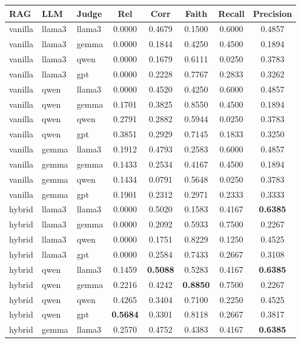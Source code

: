 
\begin{table}[ht]
\centering
\scriptsize
\begin{tabular}{lllccccc}
\toprule
RAG & LLM & Judge & Rel & Corr & Faith & Recall & Precision \\
\midrule

vanilla & llama3 & llama3 & 0.0000 & 0.4679 & 0.1500 & 0.6000 & 0.4857 \\
vanilla & llama3 & gemma & 0.0000 & 0.1844 & 0.4250 & 0.4500 & 0.1894 \\
vanilla & llama3 & qwen & 0.0000 & 0.1679 & 0.6111 & 0.0250 & 0.3783 \\
vanilla & llama3 & gpt & 0.0000 & 0.2228 & 0.7767 & 0.2833 & 0.3262 \\
vanilla & qwen & llama3 & 0.0000 & 0.4520 & 0.4250 & 0.6000 & 0.4857 \\
vanilla & qwen & gemma & 0.1701 & 0.3825 & 0.8550 & 0.4500 & 0.1894 \\
vanilla & qwen & qwen & 0.2791 & 0.2882 & 0.5944 & 0.0250 & 0.3783 \\
vanilla & qwen & gpt & 0.3851 & 0.2929 & 0.7145 & 0.1833 & 0.3250 \\
vanilla & gemma & llama3 & 0.1912 & 0.4793 & 0.2583 & 0.6000 & 0.4857 \\
vanilla & gemma & gemma & 0.1433 & 0.2534 & 0.4167 & 0.4500 & 0.1894 \\
vanilla & gemma & qwen & 0.1434 & 0.0791 & 0.5648 & 0.0250 & 0.3783 \\
vanilla & gemma & gpt & 0.1901 & 0.2312 & 0.2971 & 0.2333 & 0.3333 \\
hybrid & llama3 & llama3 & 0.0000 & 0.5020 & 0.1583 & 0.4167 & \textbf{0.6385} \\
hybrid & llama3 & gemma & 0.0000 & 0.2092 & 0.5933 & 0.7500 & 0.2267 \\
hybrid & llama3 & qwen & 0.0000 & 0.1751 & 0.8229 & 0.1250 & 0.4525 \\
hybrid & llama3 & gpt & 0.0000 & 0.2584 & 0.7433 & 0.2667 & 0.3108 \\
hybrid & qwen & llama3 & 0.1459 & \textbf{0.5088} & 0.5283 & 0.4167 & \textbf{0.6385} \\
hybrid & qwen & gemma & 0.2216 & 0.4242 & \textbf{0.8850} & 0.7500 & 0.2267 \\
hybrid & qwen & qwen & 0.4265 & 0.3404 & 0.7100 & 0.2250 & 0.4525 \\
hybrid & qwen & gpt & \textbf{0.5684} & 0.3301 & 0.8118 & 0.2667 & 0.3817 \\
hybrid & gemma & llama3 & 0.2570 & 0.4752 & 0.4383 & 0.4167 & \textbf{0.6385} \\

\end{tabular}
\end{table}
